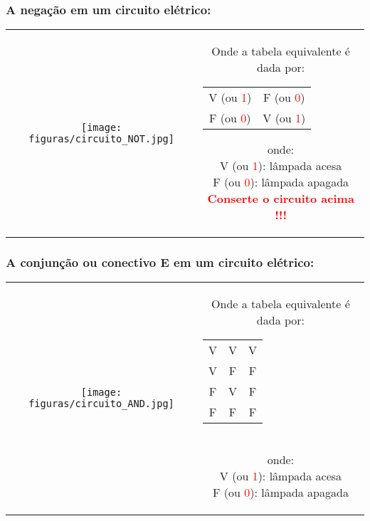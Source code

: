 \documentclass{beamer}
\begin{document}
\begin{frame}
\frametitle{A \textbf{negação} em um circuito elétrico:}

\begin{tabular}{c||c}  
 
 \texttt{[image: figuras/circuito\_NOT.jpg]} 
 
  &
  \parbox{0.4\linewidth}{\vspace{-4cm} Onde a tabela equivalente é dada por:
  \begin{tabular}{|c|c|}
	\hline
	$\mathbf{A}$ & $\mathbf{\sim A}$ \\
	\hline
	V (ou  \textcolor{red}{1}) & F (ou \textcolor{red}{0}) \\
	\hline
	F (ou \textcolor{red}{0}) & V (ou \textcolor{red}{1})  \\
	\hline
	\end{tabular}
	onde:\\
	V (ou  \textcolor{red}{1}): lâmpada acesa\\
	F (ou \textcolor{red}{0}): lâmpada apagada\\
	\textbf{\textcolor{red}{Conserte o circuito acima !!!}}
  } %

\end{tabular} 	

\end{frame}


\begin{frame}
\frametitle{A \textbf{conjunção} ou conectivo \textbf{E}  em um circuito elétrico:}

\begin{tabular}{c||c}  
 
 \texttt{[image: figuras/circuito\_AND.jpg]} 
 
  &
  \parbox{0.4\linewidth}{\vspace{-4cm} Onde a tabela equivalente é dada por:\\
  	\begin{tabular}{|c|c|c|}
	\hline
	$\mathbf{A}$ & $\mathbf{B}$ & $\mathbf{A \wedge B}$ \\
	\hline
	V & V & V \\
	\hline
	V & F & F \\
	\hline
	F & V & F \\
	\hline
	F & F & F \\
	\hline
	\end{tabular}\\
  onde:\\
	V (ou  \textcolor{red}{1}): lâmpada acesa\\
	F (ou \textcolor{red}{0}): lâmpada apagada\\

  } %

\end{tabular} 	

\end{frame}
\end{document}
